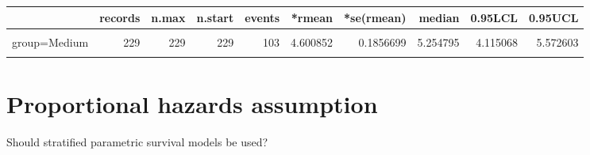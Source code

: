 \documentclass[]{article}
\begin{document}
\begin{table}[H]
\centering
\begin{tabular}{lrrrrrrrrr}
\toprule
  & records & n.max & n.start & events & *rmean & *se(rmean) & median & 0.95LCL & 0.95UCL\\
\midrule
\cellcolor{gray!6}{group=Good} & \cellcolor{gray!6}{229} & \cellcolor{gray!6}{229} & \cellcolor{gray!6}{229} & \cellcolor{gray!6}{51} & \cellcolor{gray!6}{5.934330} & \cellcolor{gray!6}{0.1616003} & \cellcolor{gray!6}{NA} & \cellcolor{gray!6}{NA} & \cellcolor{gray!6}{NA}\\
group=Medium & 229 & 229 & 229 & 103 & 4.600852 & 0.1856699 & 5.254795 & 4.115068 & 5.572603\\
\cellcolor{gray!6}{group=Poor} & \cellcolor{gray!6}{228} & \cellcolor{gray!6}{228} & \cellcolor{gray!6}{228} & \cellcolor{gray!6}{145} & \cellcolor{gray!6}{3.101736} & \cellcolor{gray!6}{0.1772520} & \cellcolor{gray!6}{2.183562} & \cellcolor{gray!6}{1.978082} & \cellcolor{gray!6}{2.619178}\\
\bottomrule
\end{tabular}
\end{table}

\newpage

\section{Proportional hazards
assumption}\label{proportional-hazards-assumption}

Should stratified parametric survival models be used?
\end{document}
